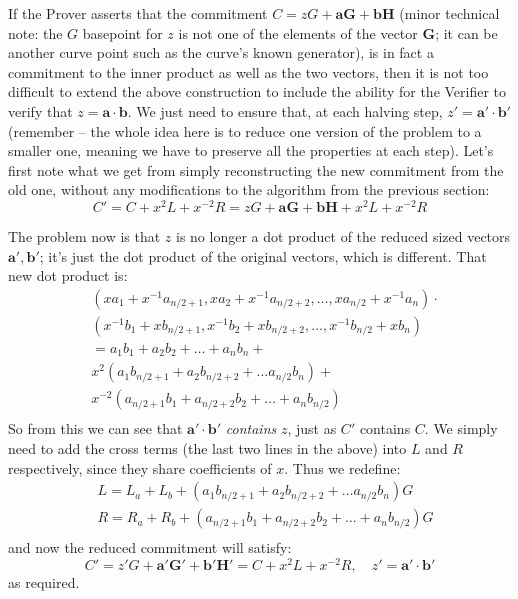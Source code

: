 \documentclass[10pt,a4paper]{article}
\begin{document}
If the Prover asserts that the commitment $C = zG + \textbf{aG} + \textbf{bH}$ (minor technical note: the $G$
basepoint for $z$ is not one of the elements of the vector $\mathbf{G}$; it can be
another curve point such as the curve's known generator), is in fact a
commitment to the inner product as well as the two vectors, then it is
not too difficult to extend the above construction to include the
ability for the Verifier to verify that $z = \mathbf{a}\cdot\mathbf{b}$. We just need to ensure that,
at each halving step, $z' = \textbf{a}' \cdot \textbf{b}'$ (remember -- the whole idea here is to reduce one
version of the problem to a smaller one, meaning we have to preserve all
the properties at each step). Let's first note what we get from simply
reconstructing the new commitment from the old one, without any
modifications to the algorithm from the previous section:
\[C' = C + x^{2}L + x^{-2}R = zG + \textbf{aG} + \textbf{bH} + x^{2}L + x^{-2}R\]

The problem now is that $z$ is no longer a dot product of the reduced sized
vectors $\mathbf{a}', \mathbf{b}'$; it's just the dot product of the original vectors, which is
different. That new dot product is:
\begin{align*}
& (xa_1 + x^{-1}a_{n/2+1}, xa_2 + x^{-1}a_{n/2+2}, \ldots, xa_{n/2} + x^{-1}a_{n}) \cdot \\
 &(x^{-1}b_1 + xb_{n/2+1}, x^{-1}b_2 + xb_{n/2+2}, \ldots, x^{-1}b_{n/2} + xb_{n}) \\
&= a_1b_1 + a_2b_2 + \ldots + a_n b_n + \\
&x^2(a_1b_{n/2+1} + a_2b_{n/2+2} + \ldots a_{n/2}b_{n} ) + \\
&x^{-2}(a_{n/2+1}b_1 + a_{n/2+2}b_2 + \ldots + a_nb_{n/2}) \\
\end{align*}
So from this we can see that $\textbf{a}' \cdot \textbf{b}'$ \emph{contains} $z$, just as $C'$ contains $C$. We
simply need to add the cross terms (the last two lines in the above)
into $L$ and $R$ respectively, since they share coefficients of $x$. Thus we
redefine:
\begin{align*}
&  L = L_a + L_b + (a_1b_{n/2+1} + a_2b_{n/2+2} + \ldots a_{n/2}b_{n} )G \\
& R = R_a + R_b + (a_{n/2+1}b_1 + a_{n/2+2}b_2 + \ldots + a_nb_{n/2})G \\
\end{align*}
and now the reduced commitment will satisfy:
\[C' = z'G + \textbf{a}'\textbf{G}' + \textbf{b}'\textbf{H}' = C + x^{2}L + x^{-2}R, \quad z' = \textbf{a}' \cdot \textbf{b}'\]
as required.
\end{document}
